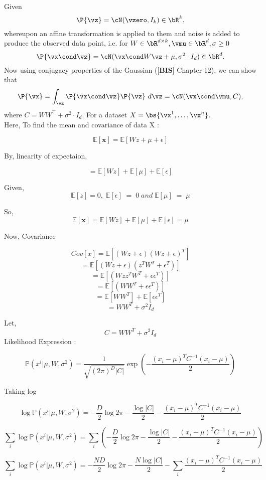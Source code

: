 \documentclass[a4paper,11pt]{article}
\begin{document}
\begin{mlsolution}

Given
\[
\P{\vz} = \cN(\vzero,I_k) \in \bR^k,
\]
whereupon an affine transformation is applied to them and noise is added to produce the observed data point, i.e. for $W \in \bR^{d\times k}, \vmu \in \bR^d, \sigma \geq 0$
\[
\P{\vx\cond\vz} = \cN(\vx\cond W\vz+\mu, \sigma^2\cdot I_d) \in \bR^d.
\]
Now using conjugacy properties of the Gaussian ([\textbf{BIS}] Chapter 12), we can show that
\[
\P{\vx} = \int_{\vz}\P{\vx\cond\vz}\P{\vz}\ d\vz = \cN(\vx\cond\vmu,C),
\]
where $C = WW^\top + \sigma^2\cdot I_d$. For a dataset $X = \bs{\vx^1,\ldots,\vx^n}$.\\

Here, To find the mean and covariance of data X :

\[
\mathbb{E}[\textbf{x}] = \mathbb{E}[Wz + \mu + \epsilon]
\]

By, linearity of expectaion,

\[
 =  \mathbb{E}[Wz] + \mathbb{E}[\mu] + \mathbb{E}[\epsilon] 
\]

Given,
\[
\mathbb{E}[z] = 0,\; \mathbb{E}[\epsilon]\; =\; 0 \;and \;\mathbb{E}[\mu]\; = \;\mu 
\]

So, 
\[
\mathbb{E}[\textbf{x}] =  \mathbb{E}[Wz] + \mathbb{E}[\mu] + \mathbb{E}[\epsilon] = \mu
\]

Now, Covariance 

\[
Cov[x] = \mathbb{E}[(Wz + \epsilon)(Wz + \epsilon)^T]
\]
\[
=  \mathbb{E}[(Wz + \epsilon)(z^TW^T + \epsilon^T)]
\]
\[
=  \mathbb{E}[(Wzz^TW^T + \epsilon\epsilon^T)]
\]
\[
=  \mathbb{E}[(WW^T + \epsilon\epsilon^T)]
\]
\[
=  \mathbb{E}[WW^T] + \mathbb{E}[\epsilon\epsilon^T]
\]
\[
=  WW^T + \sigma^2I_d
\]

Let,
 \[
    C = WW^T + \sigma^2I_d
 \]
Likelihood Expression : 

\[
\mathbb{P}(x^i | \mu, W, \sigma^2) = \frac{1}{\sqrt{(2\pi)^D |C|}} \exp\left ( -\frac{(x_i - \mu)^TC^{-1}(x_i - \mu)}{2} \right )
\]

Taking log 

\[
\log\mathbb{P}(x^i | \mu, W, \sigma^2) = -\frac{D}{2}\log2\pi - \frac{\log|C|}{2}   -\frac{(x_i - \mu)^TC^{-1}(x_i - \mu)}{2}
\]

\[
\sum_i \log\mathbb{P}(x^i | \mu, W, \sigma^2) = 
\sum_i \left (
-\frac{D}{2}\log2\pi - \frac{\log|C|}{2}   -\frac{(x_i - \mu)^TC^{-1}(x_i - \mu)}{2} \right )
\]

\[
\sum_i \log\mathbb{P}(x^i | \mu, W, \sigma^2) = 
-\frac{ND}{2}\log2\pi - \frac{N\log|C|}{2} - \sum_i\frac{(x_i - \mu)^TC^{-1}(x_i - \mu)}{2}
\]


\end{mlsolution}
\end{document}
